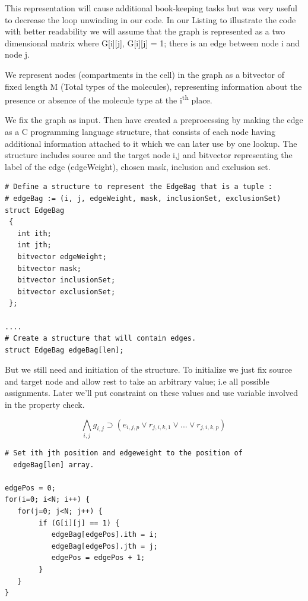 \documentclass[preprint,12pt]{elsarticle}
\begin{document}
This representation will cause additional book-keeping tasks but was very useful to decrease the loop unwinding in our code. In our Listing to illustrate the code with better readability we will assume that the graph is represented as a two dimensional matrix where G[i][j], G[i][j] = 1; there is an edge between node i and node j.


We represent nodes (compartments in the cell) in the graph as a bitvector of fixed length M (Total types of the molecules), representing information about the presence or absence of the molecule type at the i\textsuperscript{th} place.

We fix the graph as input. Then have created a preprocessing by making the edge as a C programming language structure, that consists of each node having additional information attached to it which we can later use by one lookup. The structure includes source and the target node i,j and bitvector representing the label of the edge (edgeWeight), chosen mask, inclusion and exclusion set.   

\begin{lstlisting}[mathescape,
  breaklines,
  frame=single,
  caption= \textbf{Necessary condition property.}
]
# Define a structure to represent the EdgeBag that is a tuple :
# edgeBag := (i, j, edgeWeight, mask, inclusionSet, exclusionSet)
struct EdgeBag
 {
   int ith;
   int jth;
   bitvector edgeWeight;
   bitvector mask;
   bitvector inclusionSet;
   bitvector exclusionSet;
 };
 
....
# Create a structure that will contain edges. 
struct EdgeBag edgeBag[len];     
\end{lstlisting}

But we still need and initiation of the structure. To initialize we just fix source and target node and allow rest to take an arbitrary value; i.e all possible assignments. Later we'll put constraint on these values and use variable involved in the property check.

\[ \bigwedge\limits_{i,j} g_{i,j} \supset (e_{i,j,p}  \lor r_{j,i,k,1} \lor ... \lor r_{j,i,k,p}) \, \]

\begin{lstlisting}[mathescape,
  breaklines,
  frame=single,
  caption= \textbf{Necessary condition property.}
]
# Set ith jth position and edgeweight to the position of
  edgeBag[len] array. 

edgePos = 0;
for(i=0; i<N; i++) {
   for(j=0; j<N; j++) {
        if (G[i][j] == 1) {
           edgeBag[edgePos].ith = i;
           edgeBag[edgePos].jth = j;
           edgePos = edgePos + 1;
        }
   }
}  
\end{lstlisting}
 
\end{document}
